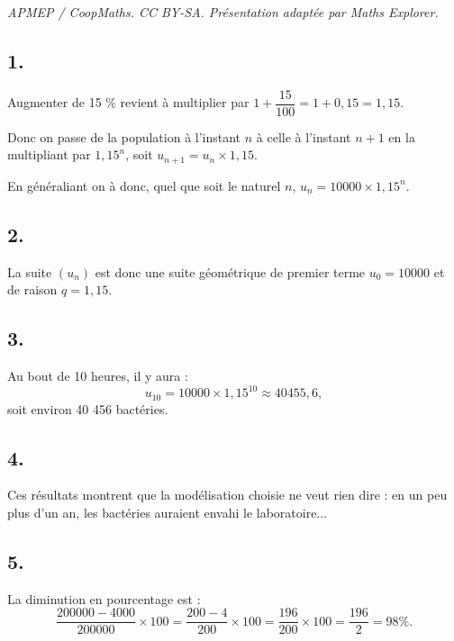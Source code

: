 \documentclass[10pt]{article}
\begin{document}
\noindent\textit{APMEP / CoopMaths. CC BY-SA. Présentation adaptée par Maths Explorer.}\par\medskip
\subsection*{1.}

Augmenter de 15 \% revient à multiplier par \(1 + \dfrac{15}{100} = 1 + 0{,}15 = 1{,}15\).

Donc on passe de la population à l'instant \(n\) à celle à l'instant \(n+1\) en la multipliant par \(1{,}15^n\), soit \(u_{n+1} = u_n \times 1{,}15\).

En généraliant on à donc, quel que soit le naturel \(n\), \(u_n = 10000 \times 1{,}15^n\).

\subsection*{2.}

La suite \((u_n)\) est donc une suite géométrique de premier terme \(u_0 = 10000\) et de raison \(q = 1{,}15\).

\subsection*{3.}

Au bout de 10 heures, il y aura :
\[
u_{10} = 10000 \times 1{,}15^{10} \approx 40455{,}6,
\]
soit environ 40 456 bactéries.

\subsection*{4.}

Ces résultats montrent que la modélisation choisie ne veut rien dire : en un peu plus d'un an, les bactéries auraient envahi le laboratoire...

\subsection*{5.}

La diminution en pourcentage est :
\[
\dfrac{200000 - 4000}{200000} \times 100 = \dfrac{200 - 4}{200} \times 100 = \dfrac{196}{200} \times 100 = \dfrac{196}{2} = 98 \%.
\]
\end{document}
